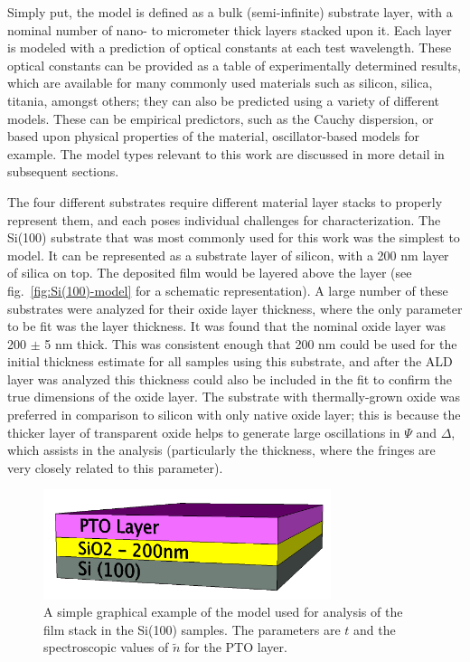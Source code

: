 Simply put, the model is defined as a bulk (semi-infinite) substrate layer, with a nominal number of nano- to micrometer thick layers stacked upon it. Each layer is modeled with a prediction of optical constants at each test wavelength. These optical constants can be provided as a table of experimentally determined results, which are available for many commonly used materials such as silicon, silica, titania, amongst others; they can also be predicted using a variety of different models. These can be empirical predictors, such as the Cauchy dispersion, or based upon physical properties of the material, oscillator-based models for example. The model types relevant to this work are discussed in more detail in subsequent sections.\cite{Bruzzese_2010} 

The four different substrates require different material layer stacks to properly represent them, and each poses individual challenges for characterization. The Si(100) substrate that was most commonly used for this work was the simplest to model. It can be represented as a substrate layer of silicon, with a 200 nm layer of silica on top. The deposited film would be layered above the  layer (see fig.~\vref{fig:Si(100)-model} for a schematic representation). A large number of these substrates were analyzed for their oxide layer thickness, where the only parameter to be fit was the layer thickness. It was found that the nominal oxide layer was 200 $\pm$ 5 nm thick. This was consistent enough that 200 nm could be used for the initial thickness estimate for all samples using this substrate, and after the ALD layer was analyzed this thickness could also be included in the fit to confirm the true dimensions of the oxide layer. The substrate with thermally-grown oxide was preferred in comparison to silicon with only native oxide layer; this is because the thicker layer of transparent oxide helps to generate large oscillations in $\Psi$ and $\Delta$, which assists in the analysis (particularly the thickness, where the fringes are very closely related to this parameter).\cite{Bruzzese_2010} 

\begin{figure}[tb]
   \centering
   \includegraphics[width=0.75\textwidth]{./figures/DataAnalysis/ellipsometry-model-Si}
   \caption[Graphical Schematic of VASE Model]{A simple graphical example of the model used for %
   					analysis of the film stack in the Si(100) samples. The parameters %
					are $t$ and the spectroscopic values of $\tilde{n}$ for the PTO layer.}
   \label{fig:Si(100)-model}
\end{figure}


